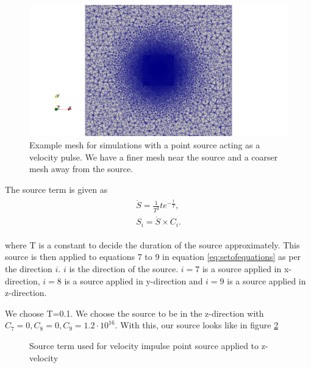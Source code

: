 \begin{figure}
    \centering
    \includegraphics[width=\linewidth]{figures/mesh_loh1.png}
    \caption{Example mesh for simulations with a point source acting as a velocity pulse. We have a finer mesh near the source and a coarser mesh away from the source.}
    \label{fig:mesh-loh1}
\end{figure}

The source term is given as 
\begin{align}
    \begin{split}
        \dot{S} = \frac{1}{T^2} t e^{-\frac{t}{T}} , \\
        S_i = \dot{S} \times C_i .
    \end{split}
    \label{eq:source}
\end{align}

where T is a constant to decide the duration of the source approximately. This source is then applied to equations 7 to 9 in equation \ref{eq:setofequations} as per the direction
$i$. $i$ is the direction of the source. $i=7$ is a source applied in x-direction,
$i=8$ is a source applied in y-direction and $i=9$ is a source applied in z-direction.

We choose T=0.1. We choose the source to be in the z-direction with $C_7 = 0, C_8 = 0, C_9 = 1.2 \cdot 10^{16}$. With this, our source looks like in figure \ref{fig:source}

\begin{figure}
    \centering
    \caption{Source term used for velocity impulse point source applied to z-velocity}
    \label{fig:source}
\end{figure}

